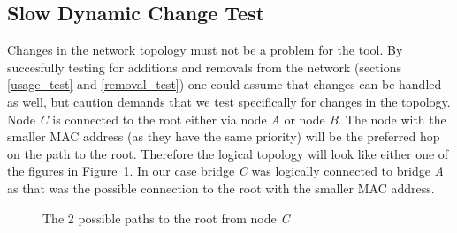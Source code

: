 \subsection{Slow Dynamic Change Test}
\label{slow_dynamic_test}
Changes in the network topology must not be a problem for the tool.
By succesfully testing for additions and removals from the network (sections \ref{usage_test} and \ref{removal_test}) one could assume that changes can be handled as well, but caution demands that we test specifically for changes in the topology.
Node \textit{C} is connected to the root either via node \textit{A} or node \textit{B}.
The node with the smaller MAC address (as they have the same priority) will be the preferred hop on the path to the root.
Therefore the logical topology will look like either one of the figures in Figure~\ref{fig:possible_topologies}.
In our case bridge \textit{C} was logically connected to bridge \textit{A} as that was the possible connection to the root with the smaller MAC address.

\begin{figure}[hp]
    \centering
    \hspace{1cm}
    \caption{The 2 possible paths to the root from node \textit{C}}
    \label{fig:possible_topologies}
\end{figure}

